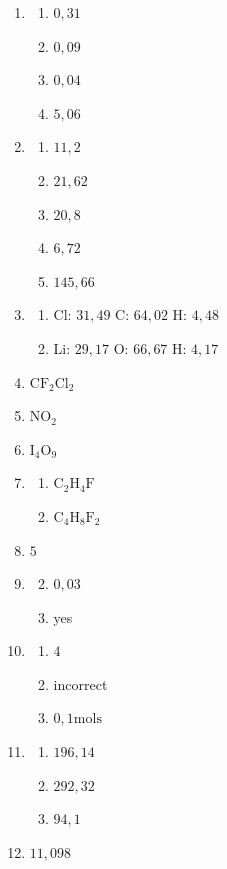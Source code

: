 \begin{multicols}{4}
\begin{enumerate}[noitemsep, label=\textbf{(\arabic*)} ]
\item
\begin{enumerate}[noitemsep, label=\textbf{(\alph*)} ]
 \item $0,31$
\item $0,09$
\item $0,04$
\item $5,06$
\end{enumerate}
\item
\begin{enumerate}[noitemsep, label=\textbf{(\alph*)} ]
 \item $11,2$
\item $21,62$
\item $20,8$
\item $6,72$
\item $145,66$
\end{enumerate}
\item
\begin{enumerate}[noitemsep, label=\textbf{(\alph*)} ]
 \item Cl: $31,49$ C: $64,02$ H: $4,48$
\item Li: $29,17$ O: $66,67$ H: $4,17$ 
\end{enumerate}
\item $\text{CF}_{2}\text{Cl}_{2}$
\item $\text{NO}_{2}$
\item $\text{I}_{4}\text{O}_{9}$
\item 
\begin{enumerate}[noitemsep, label=\textbf{(\alph*)} ]
 \item $\text{C}_{2}\text{H}_{4}\text{F}$
\item $\text{C}_{4}\text{H}_{8}\text{F}_{2}$
\end{enumerate}
\item $5$
\item
\begin{enumerate}[noitemsep, label=\textbf{(\alph*)} ]
\setcounter{enumii}{1}
\item $0,03$
\item yes
\end{enumerate}
\item
\begin{enumerate}[noitemsep, label=\textbf{(\alph*)} ]
 \item $4$
\item incorrect
\item $0,1 \text{mols}$
\end{enumerate}
\item
\begin{enumerate}[noitemsep, label=\textbf{(\alph*)} ]
 \item $196,14$
\item $292,32$
\item $94,1$
\end{enumerate}
\item $11,098$
 \end{enumerate}
\end{multicols}

